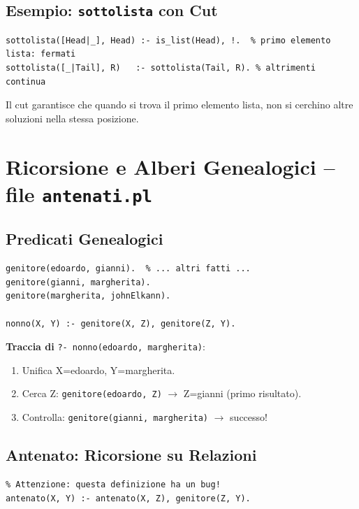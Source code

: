 \documentclass[12pt,a4paper]{article}
\begin{document}
\subsection{Esempio: \texttt{sottolista} con Cut}
\begin{lstlisting}
sottolista([Head|_], Head) :- is_list(Head), !.  % primo elemento lista: fermati
sottolista([_|Tail], R)   :- sottolista(Tail, R). % altrimenti continua
\end{lstlisting}
Il cut garantisce che quando si trova il primo elemento lista, non si cerchino
altre soluzioni nella stessa posizione.

\section{Ricorsione e Alberi Genealogici -- file \texttt{antenati.pl}}

\subsection{Predicati Genealogici}

\begin{lstlisting}
genitore(edoardo, gianni).  % ... altri fatti ...
genitore(gianni, margherita).
genitore(margherita, johnElkann).

nonno(X, Y) :- genitore(X, Z), genitore(Z, Y).
\end{lstlisting}

\textbf{Traccia di} \texttt{?- nonno(edoardo, margherita)}:
\begin{enumerate}[noitemsep]
  \item Unifica X=edoardo, Y=margherita.
  \item Cerca Z: \texttt{genitore(edoardo, Z)} $\to$ Z=gianni (primo risultato).
  \item Controlla: \texttt{genitore(gianni, margherita)} $\to$ successo!
\end{enumerate}

\subsection{Antenato: Ricorsione su Relazioni}

\begin{lstlisting}
% Attenzione: questa definizione ha un bug!
antenato(X, Y) :- antenato(X, Z), genitore(Z, Y).
\end{lstlisting}
\end{document}
